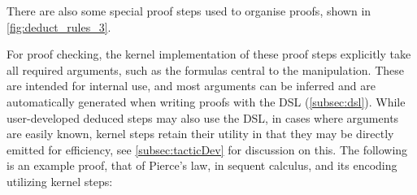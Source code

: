 There are also some special proof steps used to organise proofs, shown in \autoref{fig:deduct_rules_3}.

For proof checking, the kernel implementation of these proof steps explicitly take all required arguments, such as the formulas central to the manipulation. These are intended for internal use, and most arguments can be inferred and are automatically generated when writing proofs with the DSL (\autoref{subsec:dsl}). While user-developed deduced steps may also use the DSL, in cases where arguments are easily known, kernel steps retain their utility in that they may be directly emitted for efficiency, see \autoref{subsec:tacticDev} for discussion on this. The following is an example proof, that of Pierce's law, in sequent calculus, and its encoding utilizing kernel steps:




